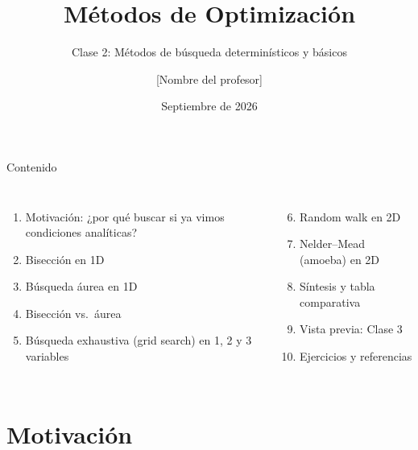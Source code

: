 \documentclass[aspectratio=169,10pt]{beamer}
\title{Métodos de Optimización}
\subtitle{Clase 2: Métodos de búsqueda determinísticos y básicos}
\author{[Nombre del profesor]}
\institute{Programa de Maestría, [Nombre de la universidad / programa]}
\date{Septiembre de 2026}
\begin{document}
\begin{frame}[plain]
  \maketitle
\end{frame}

\begin{frame}{Contenido}
  \footnotesize
  \begin{columns}[T]
    \begin{enumerate}
      \setcounter{enumi}{0}
      \item Motivación: ¿por qué buscar si ya vimos condiciones analíticas?
      \item Bisección en 1D
      \item Búsqueda áurea en 1D
      \item Bisección vs.\ áurea
      \item Búsqueda exhaustiva (grid search) en 1, 2 y 3 variables
    \end{enumerate}
    \begin{enumerate}
      \setcounter{enumi}{5}
      \item Random walk en 2D
      \item Nelder--Mead (amoeba) en 2D
      \item Síntesis y tabla comparativa
      \item Vista previa: Clase 3
      \item Ejercicios y referencias
    \end{enumerate}
  \end{columns}
\end{frame}

\section{Motivación}
\end{document}
